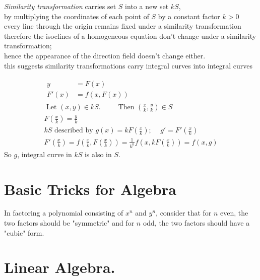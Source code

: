 \documentclass[twoside]{amsart}
\theoremstyle{plain}
\theoremstyle{definition}
\begin{document}
\emph{ Similarity transformation } carries set $S$ into a new set $kS$, \\
\phantom{Sim} by multiplying the coordinates of each point of $S$ by a constant factor $k>0$  \medskip \\
\phantom{Simila} every line through the origin remains fixed under a similarity transformation \\
\phantom{Simila} therefore the isoclines of a homogeneous equation don't change under a similarity transformation; \\
\phantom{Simila} hence the appearance of the direction field doesn't change either.  \\
\phantom{Similarity tr} this suggests similarity transformations carry integral curves into integral curves

\[
\begin{gathered}
\begin{aligned}
  y & = F(x) \\
  F'(x) & = f(x,F(x))
\end{aligned} \\
\text{ Let } (x,y) \in k S .  \quad \quad \, \text{ Then } \left( \frac{x}{k}, \frac{y}{k} \right) \in S \\
F\left( \frac{x}{k} \right) = \frac{y}{k } \\
kS \text{ described by } g(x)  = kF\left( \frac{x}{k} \right); \quad \, g' = F'\left( \frac{x}{k} \right) \\
F'\left( \frac{x}{k} \right) = f\left( \frac{x}{k}, F\left( \frac{x}{k} \right) \right) = \frac{1}{k^0} f(x, kF\left( \frac{x}{k} \right) ) = f(x,g) 
\end{gathered}
\]
So $g$, integral curve in $kS$ is also in $S$.  

\section{ Basic Tricks for Algebra }\label{S:Basic_Tricks_for_Algebra}
In factoring a polynomial consisting of $x^{n}$ and $y^{n}$, consider that for $n$ even, the two factors should be "symmetric" and for $n$ odd, the two factors should have a "cubic" form.  

\section{ Linear Algebra.}\label{S:Linear_Algebra}
\end{document}
